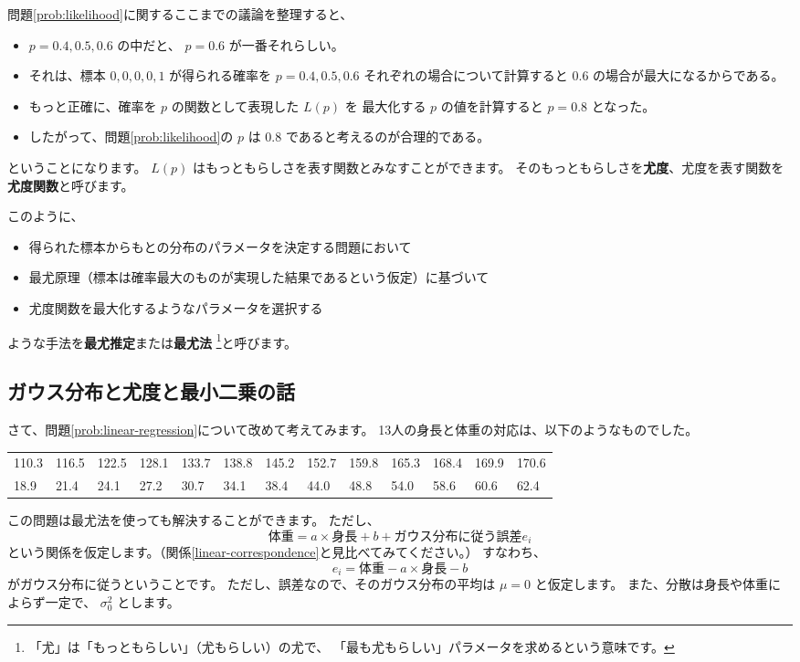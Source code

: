 \documentclass[uplatex,dvipdfmx]{jsarticle}
\begin{document}
  問題\ref{prob:likelihood}に関するここまでの議論を整理すると、
  \begin{itemize}
    \item $p = 0.4, 0.5, 0.6$ の中だと、 $p = 0.6$ が一番それらしい。
    \item それは、標本 $0, 0, 0, 0, 1$ が得られる確率を
      $p = 0.4, 0.5, 0.6$ それぞれの場合について計算すると $0.6$ の場合が最大になるからである。
    \item もっと正確に、確率を $p$ の関数として表現した $L(p)$ を
      最大化する $p$ の値を計算すると $p = 0.8$ となった。
    \item したがって、問題\ref{prob:likelihood}の $p$ は $0.8$ であると考えるのが合理的である。
  \end{itemize}
  ということになります。
  $L(p)$ はもっともらしさを表す関数とみなすことができます。
  そのもっともらしさを\textbf{尤度}、尤度を表す関数を\textbf{尤度関数}と呼びます。

  このように、
  \begin{itemize}
    \item 得られた標本からもとの分布のパラメータを決定する問題において
    \item 最尤原理（標本は確率最大のものが実現した結果であるという仮定）に基づいて
    \item 尤度関数を最大化するようなパラメータを選択する
  \end{itemize}
  ような手法を\textbf{最尤推定}または\textbf{最尤法}
  \footnote{
    「尤」は「もっともらしい」（尤もらしい）の尤で、
    「最も尤もらしい」パラメータを求めるという意味です。
  }と呼びます。

\subsection{ガウス分布と尤度と最小二乗の話}
  さて、問題\ref{prob:linear-regression}について改めて考えてみます。
  13人の身長と体重の対応は、以下のようなものでした。
  \begin{table}[htb]
    \begin{tabular}{lllllllllllll}
      110.3 & 116.5 & 122.5 & 128.1 & 133.7 & 138.8 & 145.2 & 152.7 & 159.8 & 165.3 & 168.4 & 169.9 & 170.6 \\
      18.9 & 21.4 & 24.1 & 27.2 & 30.7 & 34.1 & 38.4 & 44.0 & 48.8 & 54.0 & 58.6 & 60.6 & 62.4
    \end{tabular}
  \end{table}

  この問題は最尤法を使っても解決することができます。
  ただし、
  \begin{equation}
    \label{linear-correspondence-with-errors}
    \mbox{体重} = a \times \mbox{身長} + b + \mbox{ガウス分布に従う誤差}e_i
  \end{equation}
  という関係を仮定します。（関係\ref{linear-correspondence}と見比べてみてください。）
  すなわち、
  \[
    e_i = \mbox{体重} - a \times \mbox{身長} -b
  \]
  がガウス分布に従うということです。
  ただし、誤差なので、そのガウス分布の平均は $\mu = 0$ と仮定します。
  また、分散は身長や体重によらず一定で、 $\sigma_0^2$ とします。
\end{document}
